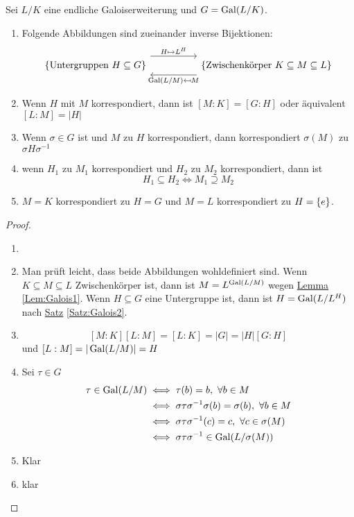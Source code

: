\begin{Satz}[Galoiskorrespondenz]
Sei \(L/K\) eine endliche Galoiserweiterung und \(G=\operatorname{Gal}(L/K)\).
\begin{enumerate}
    \item Folgende Abbildungen sind zueinander inverse Bijektionen:
$$%
\begin{tikzcd}
\Set{\text{Untergruppen \(H\subseteq G\)}} \arrow[rr, "H\mapsto L^H", shift left=4] &  & \Set{\text{Zwischenkörper \(K\subseteq M\subseteq L\)}} \arrow[ll, "\Gal(L/M)\mapsfrom M", shift left=4]
\end{tikzcd}$$
\item Wenn \(H\) mit \(M\) korrespondiert, dann ist \([M:K]=[G:H]\) oder äquivalent \([L:M]=|H|\)
\item Wenn \(\sigma\in G\) ist und \(M\) zu \(H\) korrespondiert, dann korrespondiert \(\sigma(M)\) zu \(\sigma H\sigma^{-1}\)
\item wenn \(H_1\) zu \(M_1\) korrespondiert und \(H_2\) zu \(M_2\) korrespondiert, dann ist \[H_1\subseteq H_2\iff M_1\supseteq M_2\]
\item \(M=K\) korrespondiert zu \(H=G\) und \(M=L\) korrespondiert zu \(H=\{e\}\).
\end{enumerate}
\begin{proof}
    \begin{enumerate}
        \item[] 
        \item Man prüft leicht, dass beide Abbildungen wohldefiniert sind.
        Wenn \(K\subseteq M\subseteq L\) Zwischenkörper ist, dann ist \(M=L^{\operatorname{Gal}(L/M)}\) wegen \hyperref[Lem:Galois1]{Lemma} \ref{Lem:Galois1}.
        Wenn \(H\subseteq G\) eine Untergruppe ist, dann ist \(H=\operatorname{Gal}(L/L^H)\) nach \hyperref[Satz:Galois2]{Satz} \ref{Satz:Galois2}.
        \item \[[M:K][L:M]=[L:K]=|G|=|H|[G:H]\] und \([L:M]=|\operatorname{Gal}(L/M)|=H\)
        \item Sei \(\tau\in G\)
        \begin{align*}
            \tau\in \operatorname{Gal}(L/M)&\iff \tau(b)=b,\ \forall b\in M\\
            &\iff \sigma \tau\sigma^{-1}\sigma(b)=\sigma(b),\ \forall b\in M\\
            &\iff \sigma\tau\sigma^{-1}(c)=c,\ \forall c\in \sigma(M)\\
            & \iff \sigma\tau\sigma^{-1}\in\operatorname{Gal}(L/\sigma(M))
        \end{align*}
        \item Klar
        \item klar
    \end{enumerate}
\end{proof}

\end{Satz}
